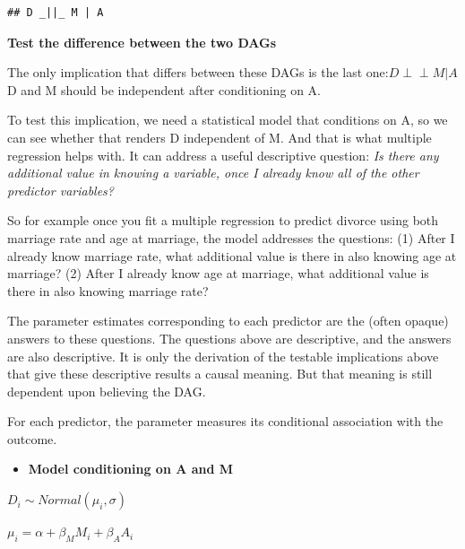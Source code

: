 \documentclass[
]{article}
\providecommand{\tightlist}{%
  \setlength{\itemsep}{0pt}\setlength{\parskip}{0pt}}
\begin{document}
\begin{verbatim}
## D _||_ M | A
\end{verbatim}

\textbf{Test the difference between the two DAGs}

The only implication that differs between these DAGs is the last
one:\(D \!\perp\!\!\!\perp M|A\) D and M should be independent after
conditioning on A.

To test this implication, we need a statistical model that conditions on
A, so we can see whether that renders D independent of M. And that is
what multiple regression helps with. It can address a useful descriptive
question: \emph{Is there any additional value in knowing a variable,
once I already know all of the other predictor variables?}

So for example once you fit a multiple regression to predict divorce
using both marriage rate and age at marriage, the model addresses the
questions: (1) After I already know marriage rate, what additional value
is there in also knowing age at marriage? (2) After I already know age
at marriage, what additional value is there in also knowing marriage
rate?

The parameter estimates corresponding to each predictor are the (often
opaque) answers to these questions. The questions above are descriptive,
and the answers are also descriptive. It is only the derivation of the
testable implications above that give these descriptive results a causal
meaning. But that meaning is still dependent upon believing the DAG.

For each predictor, the parameter measures its conditional association
with the outcome.

\begin{itemize}
\tightlist
\item
  \textbf{Model conditioning on A and M}
\end{itemize}

\(D_{i} ∼ Normal(\mu_{i}, \sigma)\)

\(\mu_{i} = \alpha + \beta_{M}M_{i} + \beta_{A}A_{i}\)
\end{document}
